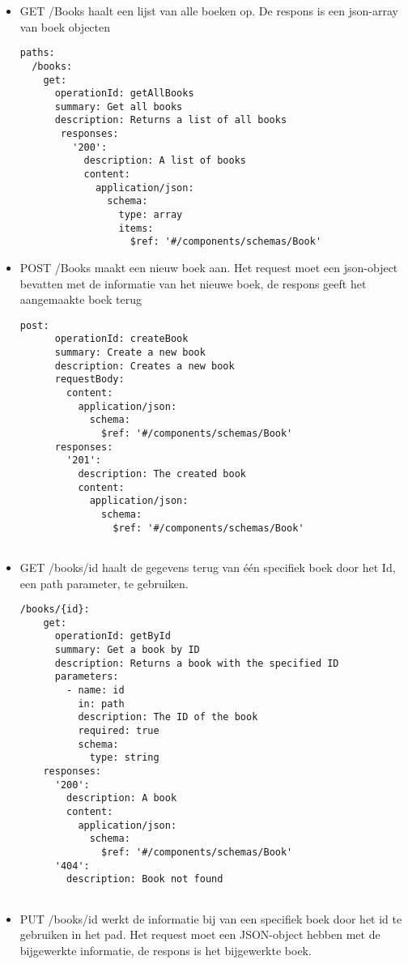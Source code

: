 \begin{itemize}
    \item	GET /Books haalt een lijst van alle boeken op. De respons is een json-array van boek objecten
\begin{lstlisting}[caption=openapi.yml file]
paths:
  /books:
    get:
      operationId: getAllBooks
      summary: Get all books
      description: Returns a list of all books
       responses:
         '200':
           description: A list of books
           content:
             application/json:
               schema:
                 type: array
                 items:
                   $ref: '#/components/schemas/Book'
     \end{lstlisting}
    \item POST /Books maakt een nieuw boek aan. Het request moet een json-object bevatten met de informatie van het nieuwe boek, de respons geeft het aangemaakte boek terug
\begin{lstlisting}[caption=openapi.yml file]
    post:
      operationId: createBook
      summary: Create a new book
      description: Creates a new book
      requestBody:
        content:
          application/json:
            schema:
              $ref: '#/components/schemas/Book'
      responses:
        '201':
          description: The created book
          content:
            application/json:
              schema:
                $ref: '#/components/schemas/Book'
        
    \end{lstlisting}
    \item GET /books/{id} haalt de gegevens terug van één specifiek boek door het Id, een path parameter, te gebruiken. 
    \begin{lstlisting}[caption=openapi.yml file]
  /books/{id}:
    get:
      operationId: getById
      summary: Get a book by ID
      description: Returns a book with the specified ID
      parameters:
        - name: id
          in: path
          description: The ID of the book
          required: true
          schema:
            type: string
    responses:
      '200':
        description: A book
        content:
          application/json:
            schema:
              $ref: '#/components/schemas/Book'
      '404':
        description: Book not found
        
    \end{lstlisting}
    \item PUT /books/{id} werkt de informatie bij van een specifiek boek door het id te gebruiken in het pad. Het request moet een JSON-object hebben met de bijgewerkte informatie, de respons is het bijgewerkte boek. 
  


\end{itemize}
